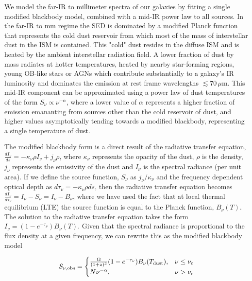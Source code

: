 We model the far-IR to millimeter spectra of our galaxies by fitting a single modified blackbody model, combined with a mid-IR power law to all sources. In the far-IR to mm regime the SED is dominated by a modified Planck function that represents the cold dust reservoir from which most of the mass of interstellar dust in the ISM is contained. This "cold" dust resides in the diffuse ISM and is heated by the ambient interstellar radiation field. A lower fraction of dust by mass radiates at hotter temperatures, heated by nearby star-forming regions, young OB-like stars or AGNs which contribute substantially to a galaxy's IR luminosity and dominates the emission at rest frame wavelengths $\lesssim 70\,\mu$m. This mid-IR component can be approximated using a power law of dust temperatures of the form $S_\nu \propto \nu^{-\alpha}$, where a lower value of $\alpha$ represents a higher fraction of emission emananting from sources other than the cold reservoir of dust, and higher values asymptotically tending towards a modified blackbody, representing a single temperature of dust.

The modified blackbody form is a direct result of the radiative transfer equation, $\frac{dI_\nu}{ds} = -\kappa_\nu \rho I_\nu + j_\nu \rho$, where $\kappa_\nu$ represents the opacity of the dust, $\rho$ is the density, $j_\nu$ represents the emissivity of the dust and $I_\nu$ is the spectral radiance (per unit area). If we define the source function, $S_\nu$ as $j_\nu/\kappa_\nu$ and the frequency dependent optical depth as $d\tau_\nu = -\kappa_\nu \rho ds$, then the radiative transfer equation becomes $\frac{dI_\nu}{d\tau_\nu} = I_\nu - S_\nu = I_\nu - B_\nu$, where we have used the fact that at local thermal equilibrium (LTE) the source function is equal to the Planck function, $B_\nu(T)$. The solution to the radiative transfer equation takes the form $I_\nu = (1 - e^{-\tau_\nu}) B_\nu(T)$. Given that the spectral radiance is proportional to the flux density at a given frequency, we can rewrite this as the modified blackbody model

\begin{equation}
	S_{\nu, \textrm{obs}} =  
	\begin{cases}
	 	\frac{\Omega}{(1+z)^3} (1- e^{-\tau_\nu}) B_\nu(T_{\textrm{dust}}), & \nu \le \nu_{\rm c} \\
	 	 N \nu^{-\alpha}, & \nu > \nu_{\rm c} \\
	\end{cases}
	\label{eq:modified_blackbody_omega}
\end{equation}

